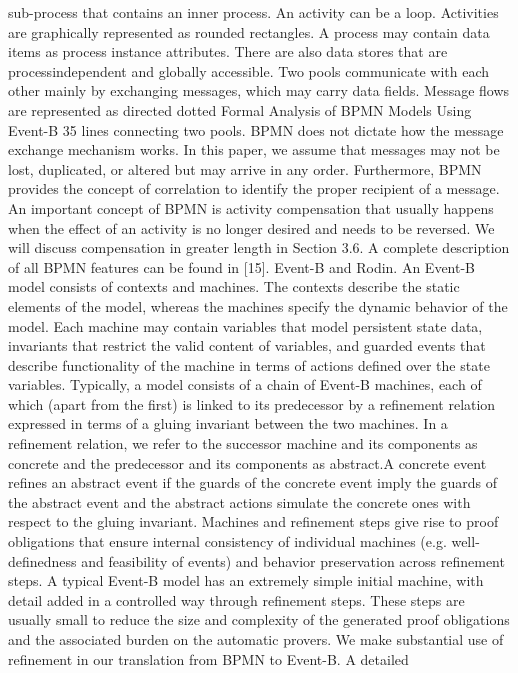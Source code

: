 sub-process that contains an inner process. An activity can be a loop. Activities
are graphically represented as rounded rectangles. A process may contain data
items as process instance attributes. There are also data stores that are processindependent and globally accessible.
Two pools communicate with each other mainly by exchanging messages,
which may carry data fields. Message flows are represented as directed dotted
Formal Analysis of BPMN Models Using Event-B 35
lines connecting two pools. BPMN does not dictate how the message exchange
mechanism works. In this paper, we assume that messages may not be lost,
duplicated, or altered but may arrive in any order. Furthermore, BPMN provides
the concept of correlation to identify the proper recipient of a message.
An important concept of BPMN is activity compensation that usually happens when the effect of an activity is no longer desired and needs to be reversed.
We will discuss compensation in greater length in Section 3.6. A complete description of all BPMN features can be found in [15].
Event-B and Rodin. An Event-B model consists of contexts and machines. The
contexts describe the static elements of the model, whereas the machines specify
the dynamic behavior of the model. Each machine may contain variables that
model persistent state data, invariants that restrict the valid content of variables, and guarded events that describe functionality of the machine in terms of
actions defined over the state variables. Typically, a model consists of a chain of
Event-B machines, each of which (apart from the first) is linked to its predecessor by a refinement relation expressed in terms of a gluing invariant between the
two machines. In a refinement relation, we refer to the successor machine and its
components as concrete and the predecessor and its components as abstract.A
concrete event refines an abstract event if the guards of the concrete event imply
the guards of the abstract event and the abstract actions simulate the concrete
ones with respect to the gluing invariant. Machines and refinement steps give
rise to proof obligations that ensure internal consistency of individual machines
(e.g. well-definedness and feasibility of events) and behavior preservation across
refinement steps. A typical Event-B model has an extremely simple initial machine, with detail added in a controlled way through refinement steps. These
steps are usually small to reduce the size and complexity of the generated proof
obligations and the associated burden on the automatic provers. We make substantial use of refinement in our translation from BPMN to Event-B. A detailed
